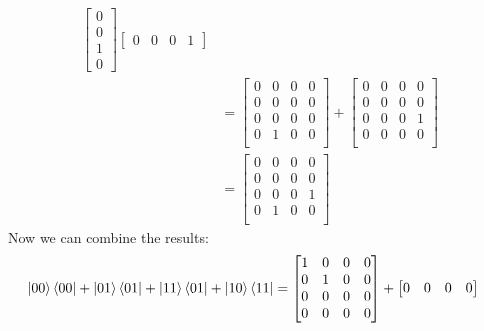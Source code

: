 \documentclass[11pt]{article}
\begin{document}
\begin{enumerate}
\begin{align*}
                \begin{bmatrix}
                    0 \\ 0 \\ 1 \\ 0
                \end{bmatrix}
                \begin{bmatrix}
                    0 & 0 & 0 & 1
                \end{bmatrix} \\
            &= \begin{bmatrix}
                0 & 0 & 0 & 0 \\
                0 & 0 & 0 & 0 \\
                0 & 0 & 0 & 0 \\
                0 & 1 & 0 & 0 \\
         \end{bmatrix}
            + 
            \begin{bmatrix}
                0 & 0 & 0 & 0 \\
                0 & 0 & 0 & 0 \\
                0 & 0 & 0 & 1 \\
                0 & 0 & 0 & 0 \\
            \end{bmatrix} \\
        &= \begin{bmatrix}
                0 & 0 & 0 & 0 \\
                0 & 0 & 0 & 0 \\
                0 & 0 & 0 & 1 \\
                0 & 1 & 0 & 0 \\
            \end{bmatrix}
        \end{align*}
    Now we can combine the results:
    \begin{align*}
        \ket{00}\bra{00} + \ket{01}\bra{01} + \ket{11}\bra{01} + \ket{10}\bra{11}
        &= \begin{bmatrix}
                1 & 0 & 0 & 0 \\
                0 & 1 & 0 & 0 \\
                0 & 0 & 0 & 0 \\
                0 & 0 & 0 & 0 \\
            \end{bmatrix} + 
            \begin{bmatrix}
                0 & 0 & 0 & 0 \\

\end{bmatrix}
\end{align*}
\end{enumerate}
\end{document}
